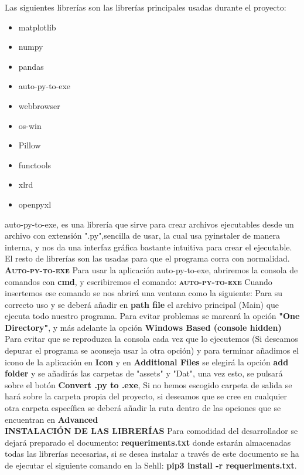 Las siguientes librerías son las librerías principales usadas durante el proyecto:
\begin{itemize}
\item matplotlib
\item numpy
\item pandas
\item auto-py-to-exe
\item webbrowser
\item os-win
\item Pillow
\item functools
\item xlrd
\item openpyxl
\end{itemize}
auto-py-to-exe, es una librería que sirve para crear archivos ejecutables desde un archivo con extensión ".py",sencilla de usar, la cual usa pyinstaler de manera interna, y nos da una interfaz gráfica bastante intuitiva para crear el ejecutable. El resto de librerías son las usadas para que el programa corra con normalidad.\\

\textbf{\textsc{Auto-py-to-exe}}
Para usar la aplicación auto-py-to-exe, abriremos la consola de comandos con \textbf{cmd}, y escribiremos el comando: \textbf{\textsc{auto-py-to-exe}}
Cuando insertemos ese comando se nos abrirá una ventana como la siguiente:
Para su correcto uso y se deberá añadir en \textbf{path file} el archivo principal (Main) que ejecuta todo nuestro programa. Para evitar problemas se marcará la opción \textbf{"One Directory"}, y más adelante la opción \textbf{Windows Based (console hidden)} Para evitar que se reproduzca la consola cada vez que lo ejecutemos (Si deseamos depurar el programa se aconseja usar la otra opción) y para terminar añadimos el icono de la aplicación en \textbf{Icon} y en \textbf{Additional Files} se elegirá la opción \textbf{add folder} y se añadirás las carpetas de "assets" y "Dat", una vez esto, se pulsará sobre el botón \textbf{Convert .py to .exe}, Si no hemos escogido carpeta de salida se hará sobre la carpeta propia del proyecto, si deseamos que se cree en cualquier otra carpeta específica se deberá añadir la ruta dentro de las opciones que se encuentran en \textbf{Advanced}\\

\textbf{\textsc{INSTALACIÓN DE LAS LIBRERÍAS}}
Para comodidad del desarrollador se dejará preparado el documento: \textbf{requeriments.txt} donde estarán almacenadas todas las librerías necesarias, si se desea instalar a través de este documento se ha de ejecutar el siguiente comando en la Sehll: \textbf{pip3 install -r requeriments.txt}.\\

